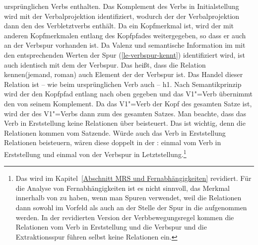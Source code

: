 ursprünglichen Verbs  enthalten. Das Komplement des Verbs in Initialstellung  wird
mit der Verbalprojektion identifiziert, wodurch der \dslw der Verbalprojektion dann den \contw des
Verbletztverbs  enthält. Da \dsl ein Kopfmerkmal ist, wird der \dslw mit anderen
Kopfmerkmalen entlang des Kopfpfades weitergegeben, so dass er auch an der Verbspur vorhanden
ist. Da Valenz und semantische Information im \dslw mit den entsprechenden Werten der Spur (\ref{le-verbspur-kennt}) identifiziert wird, ist  auch identisch mit dem
\contw der Verbspur. Das heißt, dass die Relation kennen(jemand, roman) auch Element der
\relsl der Verbspur ist. Das Handel dieser Relation ist -- wie beim ursprünglichen Verb auch --
h1. Nach Semantikprinzip wird der \ltopw den Kopfpfad entlang nach oben gegeben und das V1"=Verb
übernimmt den \ltopw von seinem Komplement. Da das V1"=Verb der Kopf des gesamten Satze ist, wird
der \ltopw des V1"=Verbs dann zum \ltopw des gesamten Satzes. Man beachte, dass das Verb in
Erststellung keine Relationen über \rels beisteuert. Das ist wichtig, denn die Relationen kommen vom
Satzende. Würde auch das Verb in Erststellung Relationen beisteuern, wären diese doppelt in der
\relsl: einmal vom Verb in Erststellung und einmal von der Verbspur in Letztstellung.\footnote{
  Das wird im Kapitel~\ref{Abschnitt MRS und Fernabhängigkeiten} revidiert. Für die Analyse von
  Fernabhängigkeiten ist es nicht sinnvoll, das Merkmal \rels innerhalb von \cont zu haben, wenn man
  Spuren verwendet, weil die Relationen dann sowohl im Vorfeld als auch an der Stelle der Spur in
  die \relsl aufgenommen werden. In der revidierten Version der Verbbewegungsregel kommen die
  Relationen vom Verb in Erststellung und die Verbspur und die Extraktionsspur führen selbst keine
  Relationen ein.
}

